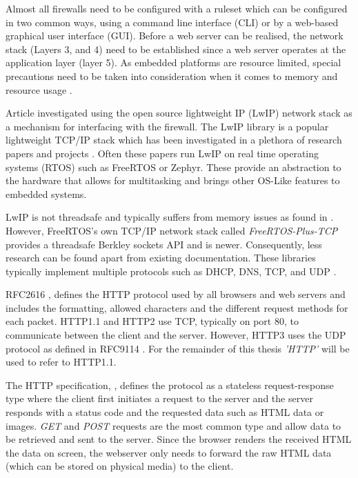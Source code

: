 Almost all firewalls need to be configured with a ruleset which can be configured in two common ways, using a command line interface (CLI) 
or by a web-based graphical user interface (GUI). Before a web server can be realised, the network stack (Layers 3, and 4) need to be established since a web server operates at the application layer (layer 5). As embedded platforms are resource limited, special precautions need to be taken into consideration when it comes to memory and resource usage \cite{OptimCortexLwIP}.

Article \cite{LwIPFPGAFirewall} investigated using the open source lightweight IP (LwIP) network stack as a mechanism for interfacing with the firewall. 
The LwIP library is a popular lightweight TCP/IP stack which has been investigated in a plethora of research papers and projects \cite{ImprovemntOptimLWIP} 
\cite{OptimCortexLwIP}. Often these papers run LwIP on real time operating systems (RTOS) such as FreeRTOS or Zephyr. These provide an abstraction to the hardware that allows for multitasking and brings other OS-Like features to embedded systems. 

LwIP is not threadsafe and typically suffers from memory issues as found in \cite{OptimCortexLwIP}. However, FreeRTOS's own TCP/IP network stack called \textit{FreeRTOS-Plus-TCP} provides a threadsafe Berkley sockets API and is newer. Consequently, less research can be found apart from existing documentation. These libraries typically implement multiple protocols such as DHCP, DNS, TCP, and UDP \cite{FreeRTOSTCP}.

RFC2616 \cite{rfc2616}, defines the HTTP protocol used by all browsers and web servers and includes the formatting, allowed characters and the different request methods for each packet. HTTP1.1 and HTTP2 use TCP, typically on port 80, to communicate between the client and the server. However, HTTP3 uses the UDP protocol as defined in RFC9114 \cite{rfc9114}. For the remainder of this thesis \textit{'HTTP'} will be used to refer to HTTP1.1.

The HTTP specification, \cite{rfc2616}, defines the protocol as a stateless request-response type where the client first initiates a request to the server and the server responds with a status code and the requested data such as HTML data or images. \textit{GET} and \textit{POST} requests are the most common type and allow data to be retrieved and sent to the server. Since the browser renders the received HTML the data on screen, the webserver only needs to forward the raw HTML data (which can be stored on physical media) to the client.